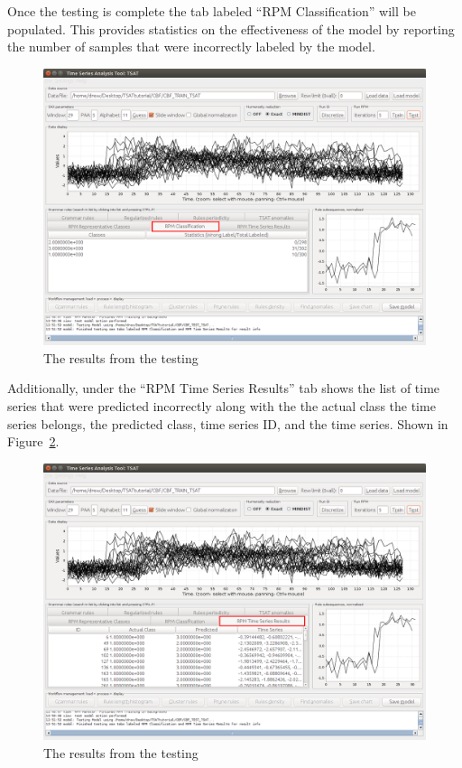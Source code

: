 \documentclass[letterpaper, 12pt]{article}
\begin{document}
\newpage
Once the testing is complete the tab labeled ``RPM Classification'' will be populated. This provides statistics on the effectiveness of the model by reporting the number of samples that were incorrectly labeled by the model.

\begin{figure}[H]
	\includegraphics[width=\textwidth]{TSAT-testing-step-2}
	\caption{The results from the testing}
	\label{fig:TSAT-testing-step-2}
\end{figure}

Additionally, under the ``RPM Time Series Results'' tab shows the list of time series that were predicted incorrectly along with the the actual class the time series belongs, the predicted class, time series ID, and the time series.  Shown in Figure~\ref{fig:TSAT-testing-step-3}.

\begin{figure}[H]
	\includegraphics[width=\textwidth]{TSAT-testing-step-3}
	\caption{The results from the testing}
	\label{fig:TSAT-testing-step-3}
\end{figure}
\end{document}
